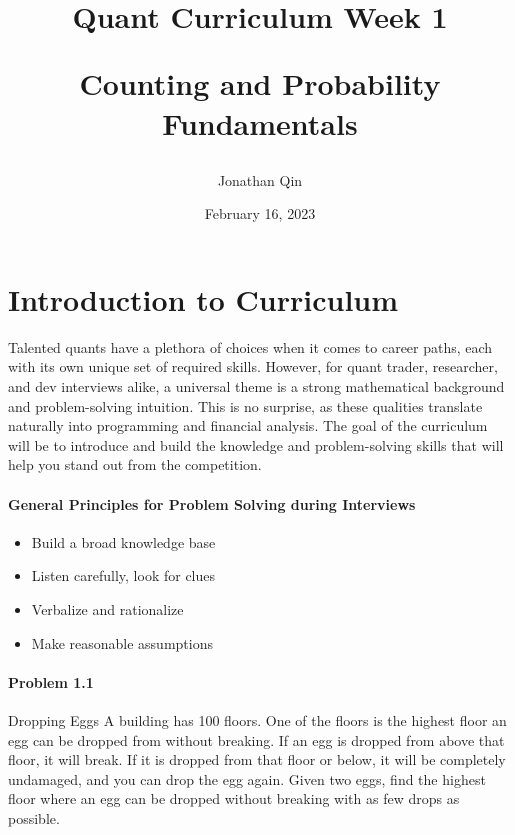 \documentclass{article}
\title{

\begin{center} \textbf{Quant Curriculum Week 1}

Counting and Probability Fundamentals \end{center}
}
\author{Jonathan Qin}
\date{February 16, 2023}
\begin{document}
\maketitle

\section{Introduction to Curriculum}

\begin{Thinking and Problem Solving}

Talented quants have a plethora of choices when it comes to career paths, each with its own unique set of required skills. However, for quant trader, researcher, and dev interviews alike, a universal theme is a strong mathematical background and problem-solving intuition. This is no surprise, as these qualities translate naturally into programming and financial analysis. The goal of the curriculum will be to introduce and build the knowledge and problem-solving skills that will help you stand out from the competition. 

\end{Thinking and Problem Solving}

\paragraph{General Principles for Problem Solving during Interviews}
\begin{itemize}
    \item Build a broad knowledge base
    \item Listen carefully, look for clues 
    \item Verbalize and rationalize 
    \item Make reasonable assumptions
\end{itemize}

\paragraph{Problem 1.1} Dropping Eggs
\newline
\newline
A building has 100 floors. One of the floors is the highest floor an egg can be dropped from without breaking.
If an egg is dropped from above that floor, it will break. If it is dropped from that floor or below, it will be completely undamaged, and you can drop the egg again. Given two eggs, find the highest floor where an egg can be dropped without breaking with as few drops as possible. 
\newline
\newline
\newline
\newline
\end{document}
